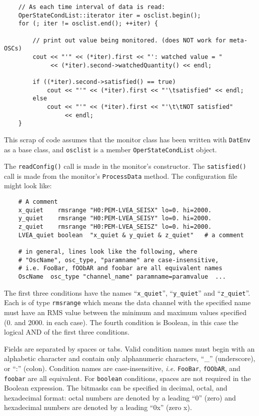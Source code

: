 {\begin{verbatim}
    // As each time interval of data is read:
    OperStateCondList::iterator iter = osclist.begin();
    for (; iter != osclist.end(); ++iter) {

        // print out value being monitored. (does NOT work for meta-OSCs)
        cout << "'" << (*iter).first << "': watched value = "
             << (*iter).second->watchedQuantity() << endl;

        if ((*iter).second->satisfied() == true)
            cout << "'" << (*iter).first << "'\tsatisfied" << endl;
        else 
            cout << "'" << (*iter).first << "'\t\tNOT satisfied" 
                 << endl;
    }
\end{verbatim}
This scrap of code assumes that the monitor class has been written
with \texttt{DatEnv} as a base class, and \texttt{osclist} is a member 
\texttt{OperStateCondList} object.

The \texttt{readConfig()} call is made in the monitor's constructor. The
\texttt{satisfied()} call is made from the monitor's \texttt{ProcessData}
method. The configuration file might look like:

\begin{verbatim}
    # A comment
    x_quiet    rmsrange "H0:PEM-LVEA_SEISX" lo=0. hi=2000.
    y_quiet    rmsrange "H0:PEM-LVEA_SEISY" lo=0. hi=2000.
    z_quiet    rmsrange "H0:PEM-LVEA_SEISZ" lo=0. hi=2000.
    LVEA_quiet boolean  "x_quiet & y_quiet & z_quiet"   # a comment

    # in general, lines look like the following, where
    # "OscName", osc_type, "paramname" are case-insensitive,
    # i.e. FooBar, fOObAR and foobar are all equivalent names
    OscName  osc_type "channel_name" paramname=paramvalue  ...
\end{verbatim}

The first three conditions have the names ``\texttt{x\_quiet}'',
``\texttt{y\_quiet}'' and ``\texttt{z\_quiet}''. Each is of type
\texttt{rmsrange}
which means the data channel with the specified name must have an RMS
value between the minimum and maximum values specified (0. and
2000. in each case).  The fourth condition is Boolean, in this case
the logical AND of the first three conditions.

Fields are separated by spaces or tabs.  Valid condition names must begin
with an alphabetic character and contain only alphanumeric characters,
``\_'' (underscore), or ``:'' (colon). Condition names are case-insensitive, 
\textit{i.e.} \texttt{FooBar}, \texttt{fOObAR}, and \texttt{foobar} are 
all equivalent.  For \texttt{boolean} conditions, spaces are not required 
in the Boolean expression. The bitmasks can be specified in decimal, octal, 
and hexadecimal format: octal numbers are denoted by a leading ``0'' (zero) 
and hexadecimal numbers are denoted by a leading ``0x'' (zero x).

}
